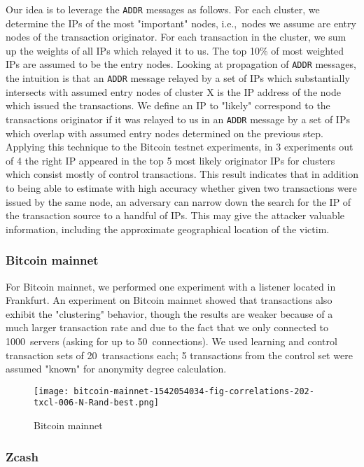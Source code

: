 Our idea is to leverage the \texttt{ADDR} messages as follows.
For each cluster, we determine the IPs of the most "important" nodes, i.e.,~nodes we assume are entry nodes of the transaction originator.
For each transaction in the cluster, we sum up the weights of all IPs which relayed it to us.
The top 10\% of most weighted IPs are assumed to be the entry nodes.
Looking at propagation of \texttt{ADDR} messages, the intuition is that an \texttt{ADDR} message relayed by a set of IPs which substantially intersects with assumed entry nodes of cluster X is the IP address of the node which issued the transactions.
We define an IP to "likely" correspond to the transactions originator if it was relayed to us in an \texttt{ADDR} message by a set of IPs which overlap with assumed entry nodes determined on the previous step.
Applying this technique to the Bitcoin testnet experiments, in 3 experiments out of 4 the right IP appeared in the top 5 most likely originator IPs for clusters which consist mostly of control transactions.
This result indicates that in addition to being able to estimate with high accuracy whether given two transactions were issued by the same node, an adversary can narrow down the search for the IP of the transaction source to a handful of IPs.
This may give the attacker valuable information, including the approximate geographical location of the victim.

\subsubsection{Bitcoin mainnet}

For Bitcoin mainnet, we performed one experiment with a listener located in Frankfurt.
An experiment on Bitcoin mainnet showed that transactions also exhibit the "clustering" behavior, though the results are weaker because of a much larger transaction rate and due to the fact that we only connected to 1000~servers (asking for up to 50~connections).
We used learning and control transaction sets of 20~transactions each; 5 transactions from the control set were assumed "known" for anonymity degree calculation.

\begin{figure}[!t]
	\texttt{[image: bitcoin-mainnet-1542054034-fig-correlations-202-txcl-006-N-Rand-best.png]}
	\caption{Bitcoin mainnet}
	\label{fig:bitoin-mainnet}
\end{figure}


\subsubsection{Zcash}

